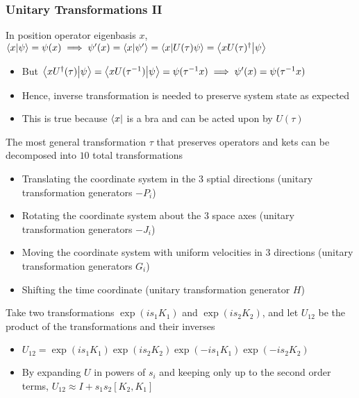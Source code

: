 \documentclass[8pt,t,mathserif,aspectratio=169]{beamer}
\begin{document}
\begin{frame}
\end{frame}

\begin{frame}
  \frametitle{Unitary Transformations II}
  \vspace{1mm}
  In position operator eigenbasis $x$, $\braket{x}{\psi} = \psi(x) \implies \psi'(x) = \braket{x}{\psi'} = \braket{x}{U(\tau)\psi} = \braket{xU(\tau)^{\dagger}}{\psi}$
  \begin{itemize}
    \item But $\braket{xU^{\dagger}(\tau)}{\psi} = \braket{xU(\tau^{-1})}{\psi} = \psi(\tau^{-1}x) \implies \psi'(x) = \psi(\tau^{-1}x)$ 
    \item Hence, inverse transformation is needed to preserve system state as expected
    \item This is true because $\bra{x}$ is a bra and can be acted upon by $U(\tau)$
  \end{itemize}
  The most general transformation $\tau$ that preserves operators and kets can be decomposed into $10$ total transformations
  \begin{itemize}
    \item Translating the coordinate system in the $3$ sptial directions (unitary transformation generators $-P_i$)
    \item Rotating the coordinate system about the $3$ space axes (unitary transformation generators $-J_i$)
    \item Moving the coordinate system with uniform velocities in $3$ directions (unitary transformation generators $G_i$)
    \item Shifting the time coordinate (unitary transformation generator $H$)
  \end{itemize}
  Take two transformations $\exp(i s_1 K_1)$ and $\exp(i s_2 K_2)$, and let $U_{12}$ be the product of the transformations and their inverses
  \begin{itemize}
    \item $U_{12} = \exp(i s_1 K_1) \exp(i s_2 K_2) \exp(-i s_1 K_1) \exp(-i s_2 K_2)$
    \item By expanding $U$ in powers of $s_i$ and keeping only up to the second order terms, $U_{12} \approx I + s_1 s_2 [K_2,K_1]$
  \end{itemize}
\end{frame}
\end{document}
